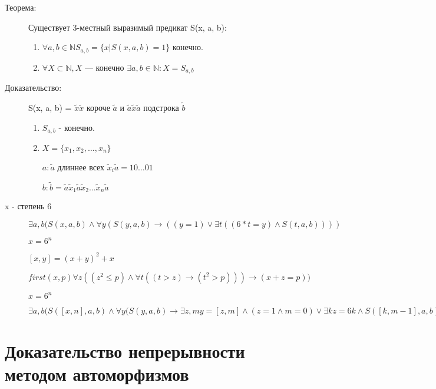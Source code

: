 \documentclass[12pt]{article}
\begin{document}
\begin{description}
\item [Теорема:] Существует 3-местный выразимый предикат S(x, a, b):
\begin{enumerate}
\item $\forall a, b \in \mathbb N S_{a, b} = \{x | S(x, a, b) = 1\}$ конечно.
\item $\forall X \subset \mathbb N, X \text{~--- конечно } \exists a, b \in \mathbb N: X = S_{a, b}$
\end{enumerate}
\item [Доказательство:]

S(x, a, b) = $\tilde x \tilde x$ короче $\tilde a$  и  $\tilde a \tilde x \tilde a$ подстрока $\tilde b$

\begin{enumerate}
\item $S_{a, b}$ - конечно.
\item $X = \{x_1, x_2, \ldots, x_n\}$

$a: \tilde a$ длиннее всех $\tilde x_i \tilde a = 10\ldots01$

$b: \tilde b = \tilde a \tilde x_1 \tilde a \tilde x_2 \ldots \tilde x_n \tilde a$  

\end{enumerate}

\item [x - степень 6]

$\exists a, b (S(x, a, b) \wedge \forall y (S(y, a, b) \to ((y = 1) \vee \exists t((6*t = y) \wedge S(t, a, b) ) ) )$

{\bf $x = 6^n$}

$[x, y] = (x + y)^2 + x$

$first(x, p) \forall z((z^2 \le p) \wedge \forall t((t > z) \to (t^2 > p))) \to (x + z = p))$

$x = 6^n$

$\exists a, b (S([x, n], a, b) \wedge \forall y(S(y, a, b) \to \exists z, m y = [z, m] \wedge (z = 1 \wedge m = 0) \vee \exists k z = 6k \wedge S([k, m - 1], a, b)$

\end{description}


\section{Доказательство непрерывности методом автоморфизмов}
\end{document}
